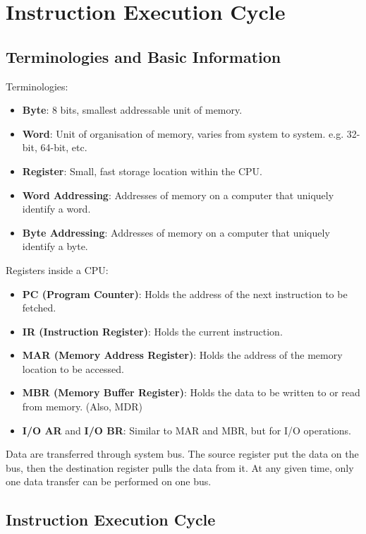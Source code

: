\section{Instruction Execution Cycle}

\subsection{Terminologies and Basic Information}

Terminologies:
\begin{itemize}
    \item \textbf{Byte}: 8 bits, smallest addressable unit of memory.
    \item \textbf{Word}: Unit of organisation of memory, varies from system to system.
        e.g. 32-bit, 64-bit, etc.
    \item \textbf{Register}: Small, fast storage location within the CPU.
    \item \textbf{Word Addressing}: Addresses of memory on a computer that uniquely
        identify a word.
    \item \textbf{Byte Addressing}: Addresses of memory on a computer that uniquely
        identify a byte.
\end{itemize}

Registers inside a CPU:
\begin{itemize}
    \item \textbf{PC (Program Counter)}: Holds the address of the next instruction
        to be fetched.
    \item \textbf{IR (Instruction Register)}: Holds the current instruction.
    \item \textbf{MAR (Memory Address Register)}: Holds the address of the memory
        location to be accessed.
    \item \textbf{MBR (Memory Buffer Register)}: Holds the data to be written to
        or read from memory. (Also, MDR)
    \item \textbf{I/O AR} and \textbf{I/O BR}: Similar to MAR and MBR, but for I/O
        operations.
\end{itemize}
Data are transferred through system bus. The source register put the data on the bus,
then the destination register pulls the data from it. At any given time, only one
data transfer can be performed on one bus.

\subsection{Instruction Execution Cycle}

